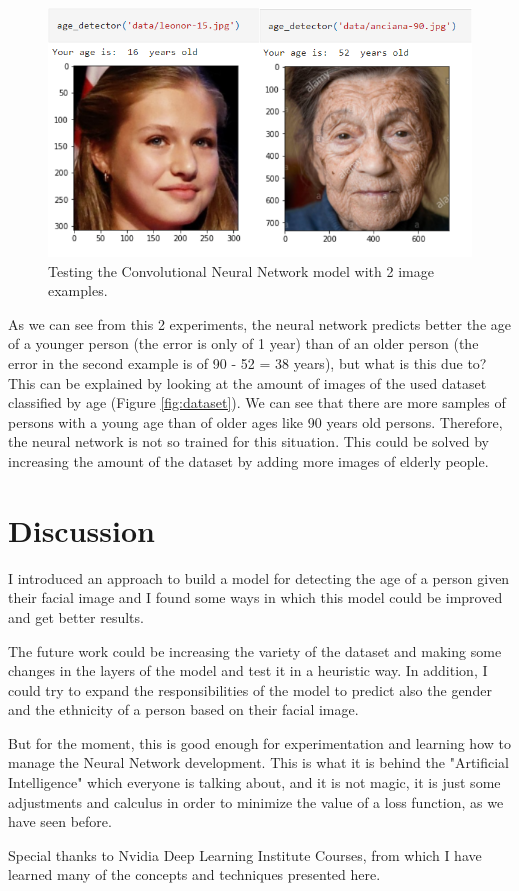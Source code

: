 \documentclass{article}
\begin{document}
\begin{figure}[t]
\centering
\includegraphics[width=1\columnwidth]{testing model.png}
\caption{Testing the Convolutional Neural Network model with 2 image examples.\label{fig:testing-model}}
\end{figure}

As we can see from this 2 experiments, the neural network predicts better the age of a younger person (the error is only of 1 year) than of an older person (the error in the second example is of 90 - 52 = 38 years), but what is this due to? 
This can be explained by looking at the amount of images of the used dataset classified by age (Figure \ref{fig:dataset}). We can see that there are more samples of persons with a young age than of older ages like 90 years old persons. Therefore, the neural network is not so trained for this situation. This could be solved by increasing the amount of the dataset by adding more images of elderly people.

\section{Discussion}

I introduced an approach to build a model for detecting the age of a person given their facial image and I found some ways in which this model could be improved and get better results. 

The future work could be increasing the variety of the dataset and making some changes in the layers of the model and test it in a heuristic way. In addition, I could try to expand the responsibilities of the model to predict also the gender and the ethnicity of a person based on their facial image.

But for the moment, this is good enough for experimentation and learning how to manage the Neural Network development. This is what it is behind the "Artificial Intelligence" which everyone is talking about, and it is not magic, it is just some adjustments and calculus in order to minimize the value of a loss function, as we have seen before.

Special thanks to Nvidia Deep Learning Institute Courses\cite{nvidiacourse}, from which I have learned many of the concepts and techniques presented here.


\end{document}
